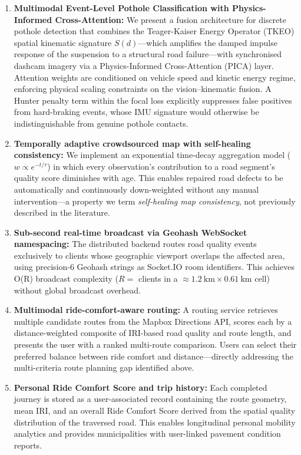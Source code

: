 \documentclass[conference]{IEEEtran}
\begin{document}
\begin{enumerate}
    \item \textbf{Multimodal Event-Level Pothole Classification with Physics-Informed Cross-Attention:} We present a fusion architecture for discrete pothole detection that combines the Teager-Kaiser Energy Operator (TKEO) spatial kinematic signature $S(d)$---which amplifies the damped impulse response of the suspension to a structural road failure---with synchronised dashcam imagery via a Physics-Informed Cross-Attention (PICA) layer.
Attention weights are conditioned on vehicle speed and kinetic energy regime, enforcing physical scaling constraints on the vision--kinematic fusion.
A Hunter penalty term within the focal loss explicitly suppresses false positives from hard-braking events, whose IMU signature would otherwise be indistinguishable from genuine pothole contacts.

    \item \textbf{Temporally adaptive crowdsourced map with self-healing consistency:} We implement an exponential time-decay aggregation model ($w \propto e^{-t/\tau}$) in which every observation's contribution to a road segment's quality score diminishes with age.
This enables repaired road defects to be automatically and continuously down-weighted without any manual intervention---a property we term \textit{self-healing map consistency}, not previously described in the literature.

    \item \textbf{Sub-second real-time broadcast via Geohash WebSocket namespacing:} The distributed backend routes road quality events exclusively to clients whose geographic viewport overlaps the affected area, using precision-6 Geohash strings as Socket.IO room identifiers.
This achieves O(R) broadcast complexity ($R =$ clients in a $\approx 1.2~\text{km} \times 0.61~\text{km}$ cell) without global broadcast overhead.

    \item \textbf{Multimodal ride-comfort-aware routing:} A routing service retrieves multiple candidate routes from the Mapbox Directions API, scores each by a distance-weighted composite of IRI-based road quality and route length, and presents the user with a ranked multi-route comparison.
Users can select their preferred balance between ride comfort and distance---directly addressing the multi-criteria route planning gap identified above.

    \item \textbf{Personal Ride Comfort Score and trip history:} Each completed journey is stored as a user-associated record containing the route geometry, mean IRI, and an overall Ride Comfort Score derived from the spatial quality distribution of the traversed road.
This enables longitudinal personal mobility analytics and provides municipalities with user-linked pavement condition reports.
\end{enumerate}
\end{document}
